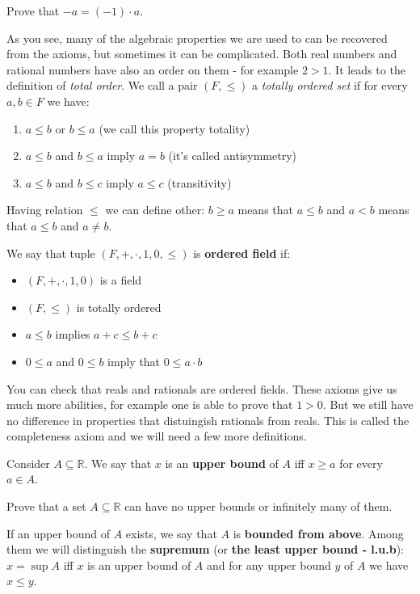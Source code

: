 \begin{prob}
  Prove that $-a=(-1)\cdot a$.
\end{prob}


As you see, many of the algebraic properties we are used to can be recovered from the axioms, but sometimes it can be complicated. Both real numbers and
rational numbers have also an order on them - for example $2>1$. It leads
to the definition of \textit{total order}. We call a pair $(F, \le)$ a \textit{totally ordered set} if for every $a,b\in F$ we have:
\begin{enumerate}
  \item $a\le b$ or $b\le a$ (we call this property totality)
  \item $a\le b$ and $b\le a$ imply $a=b$ (it's called antisymmetry)
  \item $a\le b$ and $b\le c$ imply $a\le c$ (transitivity)
\end{enumerate}
Having relation $\le$ we can define other: $b\ge a$ means that $a\le b$ and
$a<b$ means that $a\le b$ and $a\neq b$.

We say that tuple $(F, +, \cdot, 1, 0, \le)$ is \textbf{ordered field} if:
\begin{itemize}
  \item $(F, +, \cdot, 1, 0)$ is a field
  \item $(F, \le)$ is totally ordered
  \item $a\le b$ implies $a+c\le b+c$
  \item $0\le a$ and $0\le b$ imply that $0\le a\cdot b$
\end{itemize}

You can check that reals and rationals are ordered fields. These axioms give
us much more abilities, for example one is able to prove that $1>0$.
But we still have no difference in properties that distuingish rationals
from reals. This is called the completeness axiom and we will need a few
more definitions.

Consider $A\subseteq \mathbb R$. We say that $x$ is an
\textbf{upper bound} of $A$ iff $x\ge a$ for every $a\in A$.

\begin{prob}
  Prove that a set $A\subseteq \mathbb R$ can have no upper bounds
  or infinitely many of them.
\end{prob}

\noindent If an upper bound of $A$ exists, we say that $A$ is
\textbf{bounded from above}. Among them we will distinguish the
\textbf{supremum} (or \textbf{the least upper bound - l.u.b}):
$x=\sup A$ iff $x$ is an upper bound of $A$ and for any upper bound
$y$ of $A$ we have $x\le y$.

